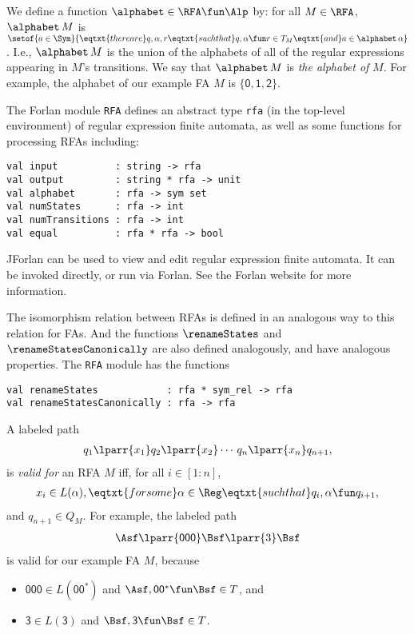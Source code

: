 We define a function $\alphabet\in\RFA\fun\Alp$ by: for all
$M\in\RFA$, $\alphabet\,M$ is $\setof{a\in\Sym}{\eqtxt{there
    are}q,\alpha,r\eqtxt{such that} q,\alpha\fun r\in
  T_M\eqtxt{and}a\in\alphabet\,\alpha}$.  I.e., $\alphabet\,M$ is the
union of the alphabets of all of the regular expressions appearing in
$M$'s transitions.  We say that $\alphabet\,M$ is \emph{the alphabet
  of} $M$.  For example, the alphabet of our example FA $M$ is
$\{\mathsf{0,1,2}\}$.

The Forlan module \texttt{RFA} defines an abstract type \texttt{rfa}
(in the top-level environment) of regular expression finite automata,
as well as some functions for processing RFAs including:
\begin{verbatim}
val input          : string -> rfa
val output         : string * rfa -> unit 
val alphabet       : rfa -> sym set
val numStates      : rfa -> int
val numTransitions : rfa -> int
val equal          : rfa * rfa -> bool
\end{verbatim}

JForlan can be used to view and edit regular expression finite
automata.  It can be invoked directly, or run via Forlan.  See the
Forlan website for more information.

The isomorphism relation between RFAs is defined in an analogous way
to this relation for FAs.  And the functions $\renameStates$
and $\renameStatesCanonically$ are also defined analogously, and
have analogous properties. The \texttt{RFA} module has the functions
\begin{verbatim}
val renameStates            : rfa * sym_rel -> rfa
val renameStatesCanonically : rfa -> rfa
\end{verbatim}

A labeled path
\begin{gather*}
q_1\lparr{x_1}q_2\lparr{x_2}\cdots\,q_n\lparr{x_n}q_{n+1} ,
\end{gather*}
is \emph{valid for} an RFA $M$ iff, for all $i\in[1:n]$,
\begin{gather*}
x_i\in L(\alpha),\eqtxt{for some}\alpha\in\Reg\eqtxt{such that}
q_i,\alpha\fun q_{i+1} ,
\end{gather*}
and $q_{n+1}\in Q_M$.
For example, the labeled path
\begin{gather*}
\Asf\lparr{\mathsf{000}}\Bsf\lparr{3}\Bsf
\end{gather*}
is valid for our example FA $M$, because
\begin{itemize}
\item $\mathsf{000}\in L(\mathsf{00^*})$ and
  $\Asf,\mathsf{00^*}\fun\Bsf\in T$, and

\item $\mathsf{3}\in L(\mathsf{3})$ and $\Bsf,\mathsf{3}\fun\Bsf\in
  T$.
\end{itemize}

